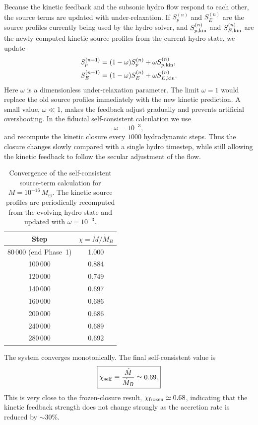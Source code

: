 \documentclass[12pt]{article}
\newcommand{\Msun}{M_\odot}
\newcommand{\Mdot}{\dot{M}}
\newcommand{\MdotB}{\dot{M}_B}
\begin{document}
Because the kinetic feedback and the subsonic hydro flow respond to
each other, the source terms are updated with under-relaxation. If
$S_p^{(n)}$ and $S_E^{(n)}$ are the source profiles currently being
used by the hydro solver, and $S_{p,{\rm kin}}^{(n)}$ and
$S_{E,{\rm kin}}^{(n)}$ are the newly computed kinetic source profiles
from the current hydro state, we update
\begin{align}
  S_p^{(n+1)}
  &=
  (1-\omega)S_p^{(n)}
  +
  \omega S_{p,{\rm kin}}^{(n)}, \\
  S_E^{(n+1)}
  &=
  (1-\omega)S_E^{(n)}
  +
  \omega S_{E,{\rm kin}}^{(n)} .
\end{align}
Here $\omega$ is a dimensionless under-relaxation parameter. The limit
$\omega=1$ would replace the old source profiles immediately with the
new kinetic prediction. A small value, $\omega\ll1$, makes the feedback
adjust gradually and prevents artificial overshooting. In the fiducial
self-consistent calculation we use
\begin{equation}
  \omega = 10^{-3},
\end{equation}
and recompute the kinetic closure every $1000$ hydrodynamic steps. Thus
the closure changes slowly compared with a single hydro timestep, while
still allowing the kinetic feedback to follow the secular adjustment of
the flow.

\begin{table}[h]
\centering
\caption{Convergence of the self-consistent source-term calculation
  for $M=10^{-16}\,\Msun$. The kinetic source profiles are periodically
  recomputed from the evolving hydro state and updated with
  $\omega=10^{-3}$.}
\label{tab:convergence}
\begin{tabular}{cc}
\toprule
Step & $\chi = \Mdot/\MdotB$ \\
\midrule
80\,000 (end Phase~1) & 1.000 \\
100\,000 & 0.884 \\
120\,000 & 0.749 \\
140\,000 & 0.697 \\
160\,000 & 0.686 \\
200\,000 & 0.686 \\
240\,000 & 0.689 \\
280\,000 & 0.692 \\
\bottomrule
\end{tabular}
\end{table}

The system converges monotonically. The final self-consistent value is
\begin{equation}
  \boxed{
  \chi_{\rm self}
  \equiv
  \frac{\Mdot}{\MdotB}
  \simeq 0.69 .
  }
  \label{eq:chi_self}
\end{equation}
This is very close to the frozen-closure result,
$\chi_{\rm frozen}\simeq0.68$, indicating that the kinetic feedback
strength does not change strongly as the accretion rate is reduced by
$\sim30\%$.
\end{document}
